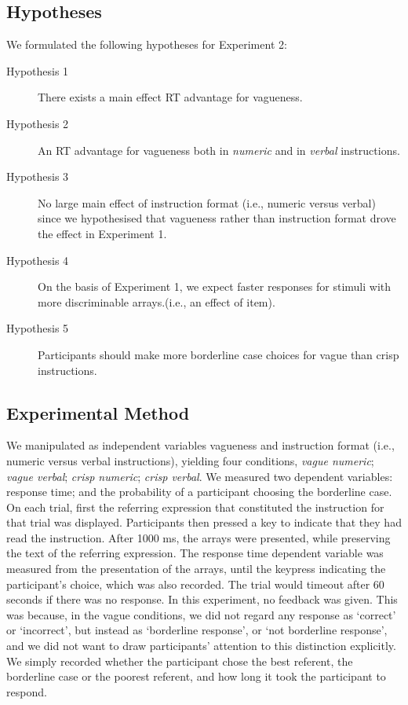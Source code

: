 \subsection{Hypotheses} 

We formulated the following hypotheses for Experiment 2:

\begin{description}
	\item [Hypothesis 1] There exists a main effect RT advantage for vagueness.
	\item [Hypothesis 2] An RT advantage for vagueness both in \emph{numeric} and in \emph{verbal} instructions.
	\item [Hypothesis 3] No large main effect of instruction format (i.e., numeric versus verbal) since we hypothesised that vagueness rather than instruction format drove the effect in Experiment 1.
	\item [Hypothesis 4] On the basis of Experiment 1, we expect faster responses for stimuli with more discriminable arrays.(i.e., an effect of item).
	\item [Hypothesis 5] Participants should make more borderline case choices for vague than crisp instructions.
\end{description}

\subsection{Experimental Method} 

We manipulated as independent variables vagueness and instruction format (i.e., numeric versus verbal instructions), yielding four conditions, \emph{vague numeric}; \emph{vague verbal}; \emph{crisp numeric}; \emph{crisp verbal}.
We measured two dependent variables: response time; and the probability of a participant choosing the borderline case.
On each trial, first the referring expression that constituted the instruction for that trial was displayed. 
Participants then pressed a key to indicate that they had read the instruction. 
After 1000 ms, the arrays were presented, while preserving the text of the referring expression. 
The response time dependent variable was measured from the presentation of the arrays, until the keypress indicating the participant's choice, which was also recorded. 
The trial would timeout after 60 seconds if there was no response.
In this experiment, no feedback was given. 
This was because, in the vague conditions, we did not regard any response as `correct' or `incorrect', but instead as `borderline response', or `not borderline response', and we did not want to draw participants' attention to this distinction explicitly. 
We simply recorded whether the participant chose the best referent, the borderline case or the poorest referent, and how long it took the participant to respond.

